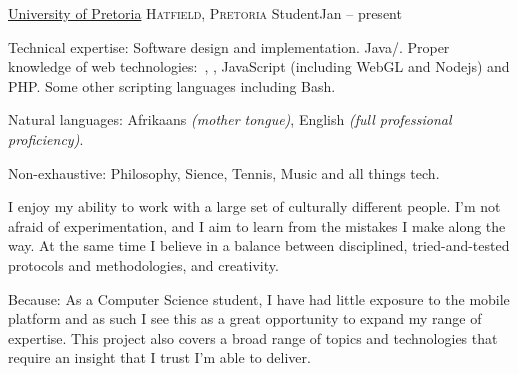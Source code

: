 \headedsection
  {\href{http://www.up.ac.za}{University of Pretoria}}
  {\textsc{Hatfield, Pretoria}} {%
  \headedsubsection
    {Student}{Jan -- present}
    {}
    }
    
\spacedhrule{-0.2em}{-0.4em}



\inlineheadsection  %
  {Technical expertise:}
  {Software design and implementation. Java/\nsp \CPP.  Proper knowledge of web technologies:\ , , JavaScript (including WebGL and Nodejs) and PHP. Some other scripting languages including Bash.}

\vspace{0.5em}
\inlineheadsection
  {Natural languages:}
  {Afrikaans \emph{(mother tongue)}, English \emph{(full professional proficiency)}.}


\spacedhrule{1.6em}{-0.4em}

\inlineheadsection
  {Non-exhaustive:}
  {Philosophy, Sience, Tennis, Music and all things tech.}

  
\spacedhrule{1.6em}{-0.4em}  
  

I enjoy my ability to work with a large set of culturally different people. I'm not afraid of experimentation, and I aim to learn from the mistakes I make along the way. At the same time I believe in a balance between disciplined, tried-and-tested protocols and methodologies, and creativity.
  
\spacedhrule{1.6em}{-0.4em}  
  

\inlineheadsection
  {Because:}
  {As a Computer Science student, I have had little exposure to the mobile platform and as such I see this as a great opportunity to expand my range of expertise. This project also covers a broad range of topics and technologies that require an insight that I trust I'm able to deliver.}
